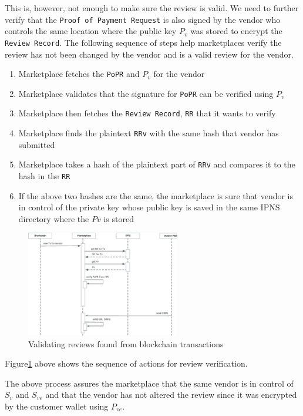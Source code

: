 \documentclass[a4paper]{article}
\begin{document}
This is, however, not enough to make sure the review is valid. We need
to further verify that the \texttt{Proof of Payment Request} is also
signed by the vendor who controls the same location where the public
key $P_v$ was stored to encrypt the \texttt{Review Record}. The
following sequence of steps help marketplaces verify the review has
not been changed by the vendor and is a valid review for the vendor.

\begin{enumerate}
\item Marketplace fetches the \texttt{PoPR} and $P_v$ for the vendor
\item Marketplace validates that the signature for \texttt{PoPR} can be
  verified using $P_v$
\item Marketplace then fetches the \texttt{Review Record}, \texttt{RR}
  that it wants to verify
\item Marketplace finds the plaintext \texttt{RRv} with the same hash that
  vendor has submitted
\item Marketplace takes a hash of the plaintext part of \texttt{RRv}
  and compares it to the hash in the \texttt{RR}
\item If the above two hashes are the same, the marketplace is sure
  that vendor is in control of the private key whose public key is
  saved in the same IPNS directory where the $Pv$ is stored
\end{enumerate}

\begin{figure}
\centering
\includegraphics[width=0.6\textwidth]{../validating-new-tx.eps}
\caption{\label{fig:validating-new-tx}Validating reviews found from blockchain transactions}
\end{figure}

Figure\ref{fig:validating-new-tx} above shows the sequence of actions
for review verification.

The above process assures the marketplace that the same vendor is in
control of $S_v$ and $S_{ve}$ and that the vendor has not altered the review
since it was encrypted by the customer wallet using $P_{ve}$.
\end{document}
